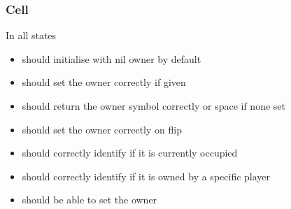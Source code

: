 \documentclass[a4wide, 11pt]{article}
\begin{document}
  \subsubsection{Cell}
  \begin{itemize}
    \begin{item}
      \vspace{-2mm}
      In all states
      \vspace{-3mm}
      \begin{itemize}
        \setlength{\itemsep}{-1mm}
        \item{should initialise with nil owner by default}
        \item{should set the owner correctly if given}
        \item{should return the owner symbol correctly or space if none set}
        \item{should set the owner correctly on flip}
        \item{should correctly identify if it is currently occupied}
        \item{should correctly identify if it is owned by a specific player}
        \item{should be able to set the owner}
      \end{itemize}
    \end{item}
  \end{itemize}
\end{document}
